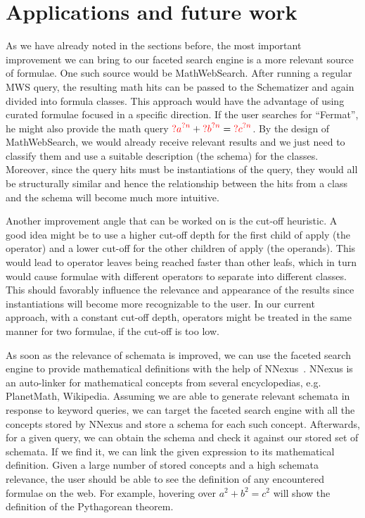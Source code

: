 \documentclass[a4paper,oneside]{article}
\def\red#1{\textcolor{red}{#1}}
\def\MWS{\textsf{MWS}\xspace}
\def\mws{\textsf{MathWebSearch}\xspace}
\begin{document}
\section{Applications and future work}\label{sec:future}
As we have already noted in the sections before, the most important improvement
we can bring to our faceted search engine is a more relevant source of
formulae. One such source would be \mws. After running a regular \MWS query,
the resulting math hits can be passed to the Schematizer and again divided into
formula classes. This approach would have the advantage of using curated
formulae focused in a specific direction. If the user searches for ``Fermat'',
he might also provide the math query
${\red{?a}}^{\red{?n}} + {\red{?b}}^{\red{?n}}={\red{?c}}^{\red{?n}}$.
By the design of \mws, we would already receive relevant results and we just
need to classify them and use a suitable description (the schema) for the
classes. Moreover, since the query hits must be instantiations of the query,
they would all be structurally similar and hence the relationship between the
hits from a class and the schema will become much more intuitive.

Another improvement angle that can be worked on is the cut-off heuristic. A
good idea might be to use a higher cut-off depth for the first child of apply
(the operator) and a lower cut-off for the other children of apply (the
operands). This would lead to operator leaves being reached faster than other
leafs, which in turn would cause formulae with different operators to separate
into different classes. This should favorably influence the relevance and
appearance of the results since instantiations will become more
recognizable to the user. In our current approach, with a constant cut-off depth,
operators might be treated in the same manner for two formulae, if the cut-off
is too low.

As soon as the relevance of schemata is improved, we can use the faceted search
engine to provide mathematical definitions with the help of
\textsf{NNexus}~\cite{GinCor:nnexus:14}. NNexus is an auto-linker for
mathematical concepts from several encyclopedias, e.g. PlanetMath, Wikipedia.
Assuming we are able to generate relevant schemata in response to keyword
queries, we can target the faceted search engine with all the concepts stored
by NNexus and store a schema for each such concept. Afterwards, for a given
query, we can obtain the schema and check it against our stored set of
schemata. If we find it, we can link the given expression to its mathematical
definition. Given a large number of stored concepts and a high schemata
relevance, the user should be able to see the definition of any encountered
formulae on the web. For example, hovering over $a^2 + b^2 = c^2$ will show the
definition of the Pythagorean theorem.
\end{document}
